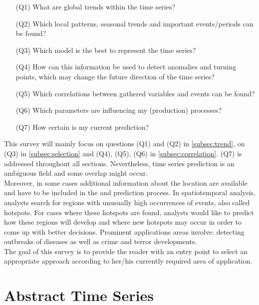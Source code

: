 \documentclass[electronic]{vgtc}             %
\begin{document}
\begin{enumerate}
	\item[(Q1)] What are global trends within the time series?
	\item[(Q2)] Which local patterns, seasonal trends and important events/periods can be found?
	\item[(Q3)] Which model is the best to represent the time series?
	\item[(Q4)] How can this information be used to detect anomalies and turning points, which may change the future direction of the time series?
	\item[(Q5)] Which correlations between gathered variables and events can be found?
	\item[(Q6)] Which parameters are influencing my (production) processes?
	\item[(Q7)] How certain is my current prediction? 
\end{enumerate}
This survey will mainly focus on questions (Q1) and (Q2) in \autoref{subsec:trend}, on (Q3) in \autoref{subsec:selection} and (Q4), (Q5), (Q6) in \autoref{subsec:correlation}.
(Q7) is addressed throughout all sections.
Nevertheless, time series prediction is an ambiguous field and some overlap might occur.\\
Moreover, in some cases additional information about the location are available and have to be included in the and prediction process. 
In spatiotemporal analysis, analysts search for regions with unusually high occurrences of events, also called hotspots.
For cases where these hotspots are found, analysts would like to predict how these regions will develop and where new hotspots may occur in order to come up with better decisions.
Prominent applications areas involve: detecting outbreaks of diseases as well as crime and terror developments. \\
The goal of this survey is to provide the reader with an entry point to select an appropriate approach according to her/his currently required area of application. 

\section{Abstract Time Series\label{sec:temporal}}
\end{document}

